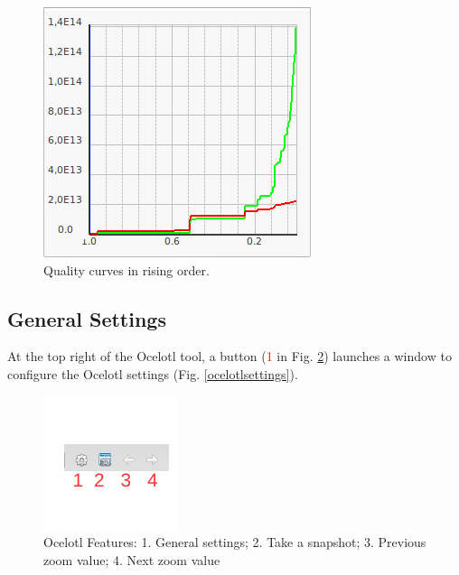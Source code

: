 \documentclass[twoside]{article}
\begin{document}
\begin{sloppypar}
\begin{figure}[h!]
	\centering
	\includegraphics[scale=0.5]{images/ocelotlCurves.png}
	\caption{Quality curves in rising order.}
	\label{aggregCurves}
\end{figure}

\subsection{General Settings}
At the top right of the Ocelotl tool, a button (\textcolor{red}{1} in Fig. \ref{ocelotlButtons}) launches a window to configure the Ocelotl settings (Fig. \ref{ocelotlsettings}).
\begin{figure}[h!]
	\centering
	\includegraphics[scale=1.5]{images/ocelotlButtons.pdf}
	\caption{Ocelotl Features: 1. General settings; 2. Take a snapshot; 3. Previous zoom value; 4. Next zoom value}
	\label{ocelotlButtons}
\end{figure}


\end{sloppypar}
\end{document}
